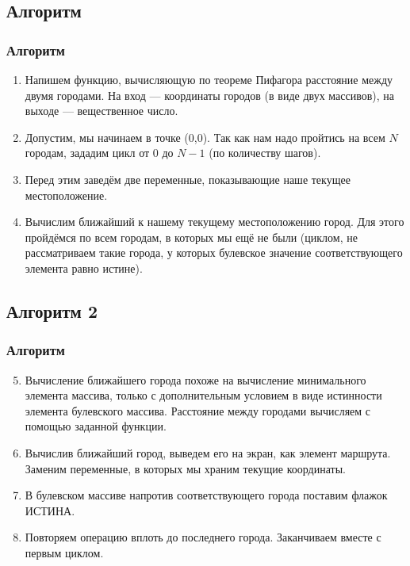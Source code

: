 \documentclass[compress,red]{beamer}
\begin{document}
\subsection{Алгоритм}
\begin{frame}[fragile]
  \frametitle{Алгоритм}
	\begin{enumerate}
		\item Напишем функцию, вычисляющую по теореме Пифагора расстояние между двумя городами. На вход --- координаты городов (в виде двух массивов), на выходе --- вещественное число.
		\item Допустим, мы начинаем в точке (0,0). Так как нам надо пройтись на всем $N$ городам, зададим цикл от 0 до $N-1$ (по количеству шагов).
		\item Перед этим заведём две переменные, показывающие наше текущее местоположение.
		\item Вычислим ближайший к нашему текущему местоположению город. Для этого пройдёмся по всем городам, в которых мы ещё не были (циклом, не рассматриваем такие города, у которых булевское значение соответствующего элемента равно истине).
 	\end{enumerate}
\end{frame}

\subsection{Алгоритм 2}
\begin{frame}[fragile]
  \frametitle{Алгоритм}
	\begin{enumerate}
		\setcounter{enumi}{4}
		\item Вычисление ближайшего города похоже на вычисление минимального элемента массива, только с дополнительным условием в виде истинности элемента булевского массива. Расстояние между городами вычисляем с помощью заданной функции.
		\item Вычислив ближайший город, выведем его на экран, как элемент маршрута. Заменим переменные, в которых мы храним текущие координаты.
		\item В булевском массиве напротив соответствующего города поставим флажок ИСТИНА.
		\item Повторяем операцию вплоть до последнего города. Заканчиваем вместе с первым циклом.
 	\end{enumerate}
\end{frame}
\end{document}
